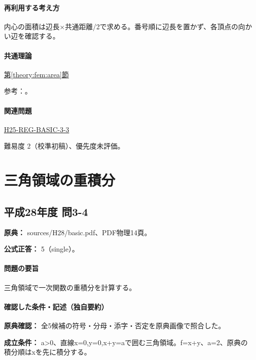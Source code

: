 \paragraph{再利用する考え方} 内心の面積は辺長×共通距離/2で求める。番号順に辺長を置かず、各頂点の向かい辺を確認する。

\paragraph{共通理論} \hyperref[theory:fem:area]{第\ref*{theory:fem:area}節}

\par 参考：\cite{mit_roy_fea1999}。

\paragraph{関連問題} \hyperref[q:h25-reg-basic-3-3]{H25-REG-BASIC-3-3}

\par 難易度 2（校準初稿）、優先度未評価。

\section{三角領域の重積分}

\subsection{平成28年度 問3-4}
\label{q:h28-reg-basic-3-4}

\noindent\textbf{原典：} sources/H28/basic.pdf、PDF物理14頁。

\textbf{公式正答：} 5（single）。

\paragraph{問題の要旨} 三角領域で一次関数の重積分を計算する。

\paragraph{確認した条件・記述（独自要約）}\mbox{}\par

\noindent\textbf{原典確認：} 全5候補の符号・分母・添字・否定を原典画像で照合した。\par

\noindent\textbf{成立条件：} a>0、直線x=\allowbreak{}0,y=\allowbreak{}0,x+y=\allowbreak{}aで囲む三角領域。f=\allowbreak{}x+y、a=\allowbreak{}2、原典の積分順はxを先に積分する。\par

